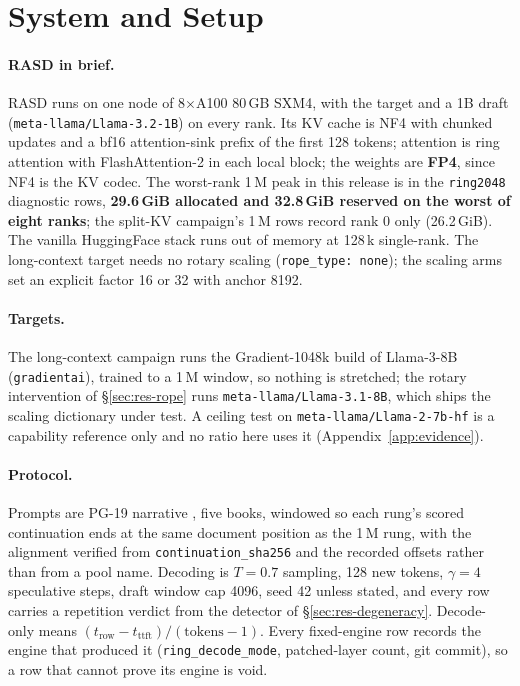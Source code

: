 \documentclass{article}
\begin{document}
\section{System and Setup}
\label{sec:setup}

\paragraph{RASD in brief.} RASD runs on one node of 8$\times$A100 80\,GB SXM4, with the
target and a 1B draft (\texttt{meta-llama/Llama-3.2-1B}) on every rank. Its KV cache is NF4
with chunked updates and a bf16 attention-sink prefix of the first 128 tokens; attention is
ring attention with FlashAttention-2 in each local block; the weights are \textbf{FP4}, since
NF4 is the KV codec. The worst-rank 1\,M peak in this release is in the \texttt{ring2048}
diagnostic rows, \textbf{29.6\,GiB allocated and 32.8\,GiB reserved on the worst of eight
ranks}; the split-KV campaign's 1\,M rows record rank 0 only (26.2\,GiB). The vanilla
HuggingFace stack runs out of memory at 128\,k single-rank. The long-context target needs no
rotary scaling (\texttt{rope\_type: none}); the scaling arms set an explicit factor 16 or 32
with anchor 8192.

\paragraph{Targets.} The long-context campaign runs the Gradient-1048k build of Llama-3-8B
(\texttt{gradientai}), trained to a 1\,M window, so nothing is stretched; the rotary
intervention of \S\ref{sec:res-rope} runs \texttt{meta-llama/Llama-3.1-8B}, which ships the
scaling dictionary under test. A ceiling test on \texttt{meta-llama/Llama-2-7b-hf} is a
capability reference only and no ratio here uses it (Appendix~\ref{app:evidence}).

\paragraph{Protocol.} Prompts are PG-19 narrative \citep{rae2020pg19}, five books, windowed
so each rung's scored continuation ends at the same document position as the 1\,M rung, with
the alignment verified from \texttt{continuation\_sha256} and the recorded offsets rather than
from a pool name. Decoding is $T{=}0.7$ sampling, 128 new tokens, $\gamma{=}4$ speculative
steps, draft window cap 4096, seed 42 unless stated, and every row carries a repetition verdict
from the detector of \S\ref{sec:res-degeneracy}. Decode-only means
$(t_{\text{row}} - t_{\text{ttft}}) / (\text{tokens}-1)$. Every fixed-engine row records the
engine that produced it (\texttt{ring\_decode\_mode}, patched-layer count, git commit), so a
row that cannot prove its engine is void.
\end{document}
